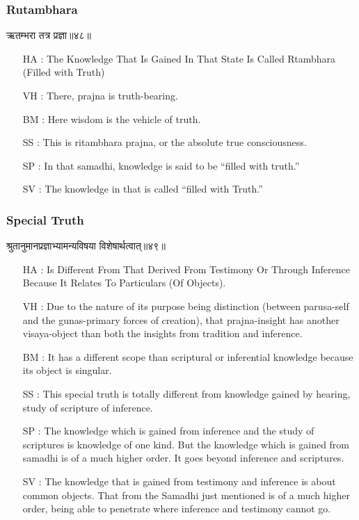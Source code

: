\begin{frame}[fragile]\frametitle{Rutambhara}
\begin{sanskrit}
ऋतम्भरा तत्र प्रज्ञा॥४८॥
\end{sanskrit}

	\begin{itemize}
	\item [HA]: The Knowledge That Is Gained In That State Is Called Rtambhara (Filled with Truth)
	\item [VH]: There, prajna is truth-bearing.
	\item [BM]: Here wisdom is the vehicle of truth.
	\item [SS]: This is ritambhara prajna, or the absolute true consciousness.
	\item [SP]: In that samadhi, knowledge is said to be “filled with truth.”
	\item [SV]: The knowledge in that is called “filled with Truth.” 
	\end{itemize}
\end{frame}



\begin{frame}[fragile]\frametitle{Special Truth}
\begin{sanskrit}
श्रुतानुमानप्रज्ञाभ्यामन्यविषया विशेषार्थत्वात्॥४९॥
\end{sanskrit}

	\begin{itemize}
	\item [HA]: Is Different From That Derived From Testimony Or Through Inference Because It Relates To Particulars (Of Objects).
	\item [VH]: Due to the nature of its purpose being distinction (between parusa-self and the gunas-primary forces of creation), that prajna-insight has another visaya-object than both the insights from tradition and inference.
	\item [BM]: It has a different scope than scriptural or inferential knowledge because its object is singular.
	\item [SS]: This special truth is totally different from knowledge gained by hearing, study of scripture of inference.
	\item [SP]: The knowledge which is gained from inference and the study of scriptures is knowledge of one kind. But the knowledge which is gained from samadhi is of a much higher order. It goes beyond inference and scriptures.
	\item [SV]: The knowledge that is gained from testimony and inference is about common objects. That from the Samadhi just mentioned is of a much higher order, being able to penetrate where inference and testimony cannot go. 
	\end{itemize}
\end{frame}


